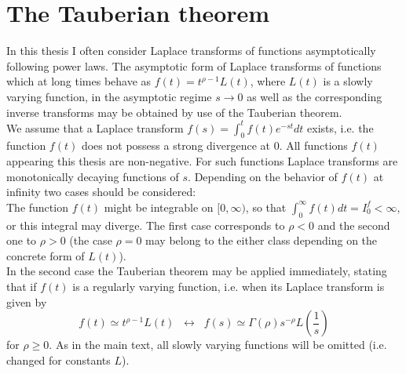 \chapter*{The Tauberian theorem} \label{sec:tauberian}

In this thesis I often consider Laplace transforms of functions asymptotically following power laws. The asymptotic form of Laplace transforms of functions which at long times behave as $f(t) = t^{\rho-1} L(t)$, where $L(t)$ is a slowly varying function, in the asymptotic regime $s \to 0$ as well as the corresponding inverse transforms may be obtained by use of the Tauberian theorem. \\

We assume that a Laplace transform $f(s) = \int_0^t f(t) e^{-st} dt$ exists, i.e. the function $f(t)$ does not possess a strong divergence at 0. All functions $f(t)$ appearing this thesis are non-negative. For such functions Laplace transforms are monotonically decaying functions of $s$. Depending on the behavior of $f(t)$ at infinity two cases should be considered: \\
The function $f(t)$ might be integrable on $[0, \infty)$, so that 
$\int_0^\infty f(t) dt = I_0^{f} < \infty$, or this integral may diverge. The first case corresponds to $\rho < 0$ and 
the second one to $\rho > 0$ (the case $\rho = 0$ may belong to the either class depending on the concrete form of $L(t)$). \\
In the second case the Tauberian theorem may be applied immediately, stating that if $f(t)$ is a regularly varying function, i.e. when  its Laplace transform is given by 
\begin{equation}
 f(t) \simeq t^{\rho-1} L(t) \;\; \leftrightarrow \;\; f(s) \simeq \Gamma(\rho) s^{-\rho} L\left(\frac{1}{s}\right)
 \label{eq:Tauberian}
\end{equation}
for $\rho \geq 0$. As in the main text, all slowly varying functions will be omitted (i.e. changed for constants $L$). 

